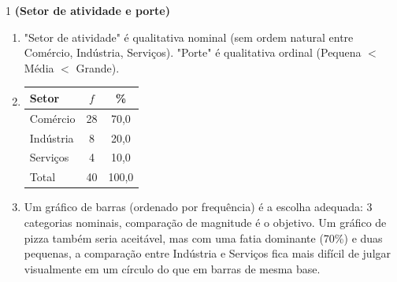 \documentclass[11pt]{article}
\begin{document}

\begin{questao}{1} \textbf{(Setor de atividade e porte)}
\begin{solucao}
\begin{enumerate}[label=(\alph*)]
  \item "Setor de atividade" é qualitativa nominal (sem ordem natural entre Comércio, Indústria,
    Serviços). "Porte" é qualitativa ordinal (Pequena $<$ Média $<$ Grande).
  \item
  \begin{center}
  \begin{tabular}{lcc}
  \toprule
  Setor & $f$ & \% \\
  \midrule
  Comércio  & 28 & 70,0 \\
  Indústria & 8  & 20,0 \\
  Serviços  & 4  & 10,0 \\
  \midrule
  Total     & 40 & 100,0 \\
  \bottomrule
  \end{tabular}
  \end{center}
  \item Um gráfico de barras (ordenado por frequência) é a escolha adequada: 3 categorias
    nominais, comparação de magnitude é o objetivo. Um gráfico de pizza também seria aceitável,
    mas com uma fatia dominante (70\%) e duas pequenas, a comparação entre Indústria e Serviços
    fica mais difícil de julgar visualmente em um círculo do que em barras de mesma base.
\end{enumerate}
\end{solucao}
\end{questao}
\end{document}
